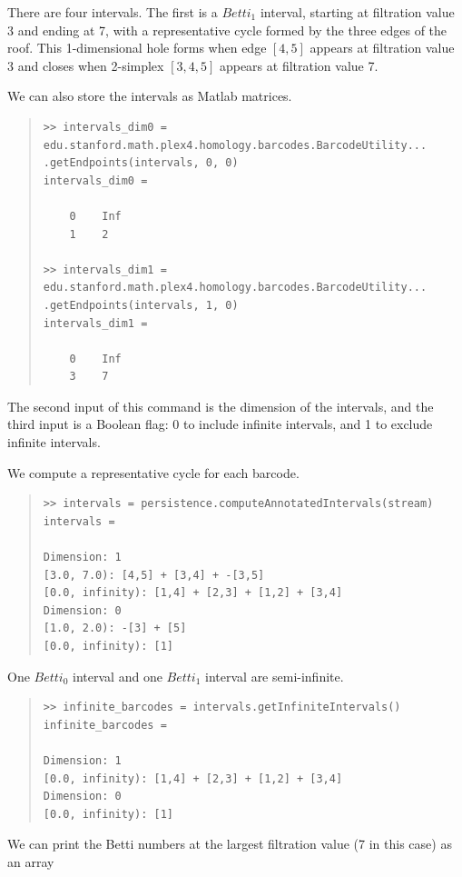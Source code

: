 \documentclass[amscd, amssymb, verbatim]{amsart}[12pt]
\theoremstyle{remark}
\theoremstyle{remark}
\theoremstyle{remark}
\begin{document}
There are four intervals. The first is a $Betti_1$ interval, starting at filtration value 3 and ending at 7, with a representative cycle formed by the three edges of the roof. This 1-dimensional hole forms when edge $[4,5]$ appears at filtration value 3 and closes when 2-simplex $[3,4,5]$ appears at filtration value 7.

We can also store the intervals as Matlab matrices.

\begin{quote} \begin{verbatim}
>> intervals_dim0 = edu.stanford.math.plex4.homology.barcodes.BarcodeUtility...
.getEndpoints(intervals, 0, 0)
intervals_dim0 =

    0    Inf
    1    2
    
>> intervals_dim1 = edu.stanford.math.plex4.homology.barcodes.BarcodeUtility...
.getEndpoints(intervals, 1, 0)
intervals_dim1 =

    0    Inf
    3    7
\end{verbatim} \end{quote}

The second input of this command is the dimension of the intervals, and the third input is a Boolean flag: 0 to include infinite intervals, and 1 to exclude infinite intervals.

We compute a representative cycle for each barcode.

\begin{quote} \begin{verbatim}
>> intervals = persistence.computeAnnotatedIntervals(stream)
intervals =

Dimension: 1
[3.0, 7.0): [4,5] + [3,4] + -[3,5]
[0.0, infinity): [1,4] + [2,3] + [1,2] + [3,4]
Dimension: 0
[1.0, 2.0): -[3] + [5]
[0.0, infinity): [1]
\end{verbatim} \end{quote}

One $Betti_0$ interval and one $Betti_1$ interval are semi-infinite. 
\begin{quote} \begin{verbatim}
>> infinite_barcodes = intervals.getInfiniteIntervals()
infinite_barcodes = 

Dimension: 1
[0.0, infinity): [1,4] + [2,3] + [1,2] + [3,4]
Dimension: 0
[0.0, infinity): [1]
\end{verbatim} \end{quote}

We can print the Betti numbers at the largest filtration value (7 in this case) as an array
\end{document}
